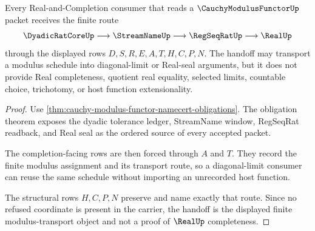 \begin{theorem}
\label{thm:cauchy-modulus-functor-completion-handoff}
Every Real-and-Completion consumer that reads a $\CauchyModulusFunctorUp$ packet receives the finite route
$$
\DyadicRatCoreUp \longrightarrow \StreamNameUp \longrightarrow \RegSeqRatUp \longrightarrow \RealUp
$$
through the displayed rows $D,S,R,E,A,T,H,C,P,N$. The handoff may transport a modulus schedule into diagonal-limit or Real-seal arguments, but it does not provide Real completeness, quotient real equality, selected limits, countable choice, trichotomy, or host function extensionality.
\end{theorem}
\begin{proof}
Use \autoref{thm:cauchy-modulus-functor-namecert-obligations}. The obligation theorem exposes the dyadic tolerance ledger, StreamName window, RegSeqRat readback, and Real seal as the ordered source of every accepted packet.

The completion-facing rows are then forced through $A$ and $T$. They record the finite modulus assignment and its transport route, so a diagonal-limit consumer can reuse the same schedule without importing an unrecorded host function.

The structural rows $H,C,P,N$ preserve and name exactly that route. Since no refused coordinate is present in the carrier, the handoff is the displayed finite modulus-transport object and not a proof of $\RealUp$ completeness.
\end{proof}


\begin{closurestatus}{\CauchyModulusFunctorUp}
  \theoryclosure{\seedClosure}
  \formalstatus{\unformalizedV}
\end{closurestatus}
